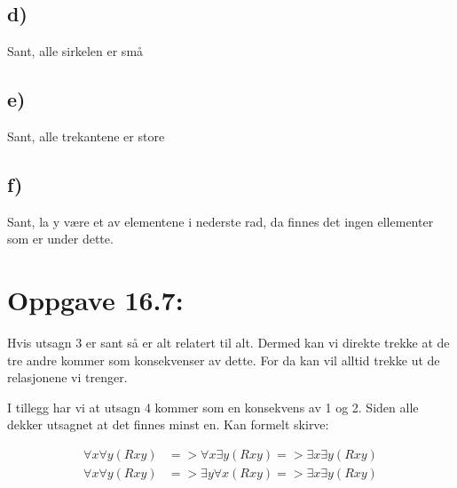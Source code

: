 \documentclass[a4paper, norsk, 10pt]{article}
\begin{document}
\begin{flushleft}
  \subsection*{d)}
  Sant, alle sirkelen er små
  
  \subsection*{e)}
  Sant, alle trekantene er store
  
  \subsection*{f)}
  Sant, la y være et av elementene i nederste rad, da finnes det ingen ellementer som er under dette.

  \section*{Oppgave 16.7:}

    Hvis utsagn 3 er sant så er alt relatert til alt. Dermed kan vi direkte trekke at de tre andre kommer som konsekvenser av dette. For da kan vil alltid trekke ut de relasjonene vi trenger.

    I tillegg har vi at utsagn 4 kommer som en konsekvens av 1 og 2. Siden alle dekker utsagnet at det finnes minst en. Kan formelt skirve:

    \begin{align*}
      \forall x \forall y (Rxy) &=> \forall x \exists y (Rxy) => \exists x \exists y (Rxy) \\
      \forall x \forall y (Rxy) &=> \exists y \forall x (Rxy) => \exists x \exists y (Rxy) \\
    \end{align*}
\end{flushleft}
\end{document}

